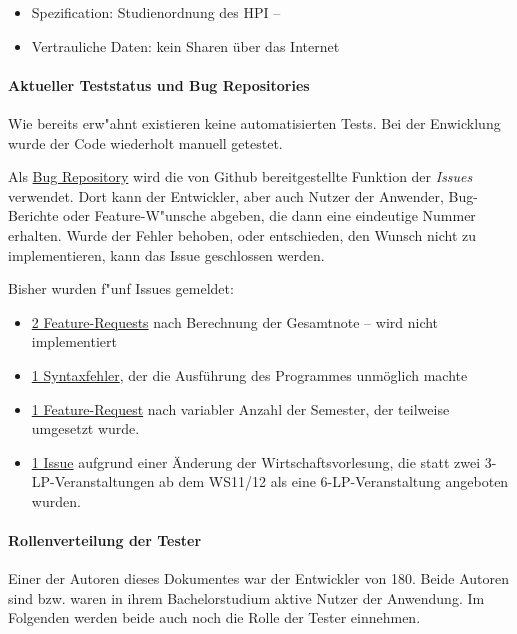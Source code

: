 \documentclass[ngerman]{article}
\begin{document}
\begin{itemize}
    \item
        Spezification: Studienordnung des HPI -- 
    \item
        Vertrauliche Daten: kein Sharen über das Internet
\end{itemize}

\paragraph{Aktueller Teststatus und Bug Repositories}

Wie bereits erw"ahnt existieren keine automatisierten Tests.
Bei der Enwicklung wurde der Code wiederholt manuell getestet.

Als \href{https://github.com/knub/onehundredandeighty/issues?q=is:issue}{Bug Repository} wird die von Github bereitgestellte Funktion der \emph{Issues} verwendet.
Dort kann der Entwickler, aber auch Nutzer der Anwender, Bug-Berichte oder Feature-W"unsche abgeben, die dann eine eindeutige Nummer erhalten.
Wurde der Fehler behoben, oder entschieden, den Wunsch nicht zu implementieren, kann das Issue geschlossen werden.

Bisher wurden f"unf Issues gemeldet:
\begin{itemize}
    \item
        \href{https://github.com/knub/onehundredandeighty/issues/30}{2 Feature-Requests} nach Berechnung der Gesamtnote -- wird nicht implementiert
    \item
        \href{https://github.com/knub/onehundredandeighty/issues/20}{1 Syntaxfehler}, der die Ausführung des Programmes unmöglich machte
    \item
        \href{https://github.com/knub/onehundredandeighty/issues/4}{1 Feature-Request} nach variabler Anzahl der Semester, der teilweise umgesetzt wurde.
    \item
        \href{https://github.com/knub/onehundredandeighty/pull/5}{1 Issue} aufgrund einer Änderung der Wirtschaftsvorlesung, die statt zwei 3-LP-Veranstaltungen ab dem WS11/12 als eine 6-LP-Veranstaltung angeboten wurden.
\end{itemize}

\paragraph{Rollenverteilung der Tester}

Einer der Autoren dieses Dokumentes war der Entwickler von 180.
Beide Autoren sind bzw. waren in ihrem Bachelorstudium aktive Nutzer der Anwendung.
Im Folgenden werden beide auch noch die Rolle der Tester einnehmen.
\end{document}
